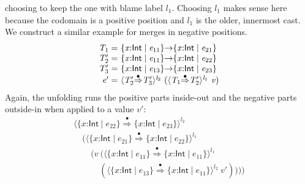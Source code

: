 \documentclass[9pt]{extarticle}
\newcommand{\ottnt}[1]{\mathit{#1}}
\begin{document}
choosing to keep the one with blame label $\ottnt{l_{{\mathrm{1}}}}$. Choosing $\ottnt{l_{{\mathrm{1}}}}$
makes sense here because the codomain is a positive position and
$\ottnt{l_{{\mathrm{1}}}}$ is the older, innermost cast.
We construct a similar example for merges in negative positions.
\[ \begin{array}{r@{~}l}
   \ottnt{T_{{\mathrm{1}}}} = &   \{ \mathit{x} \mathord{:}  \mathsf{Int}  \mathrel{\mid} \ottnt{e_{{\mathrm{11}}}} \}  \mathord{ \rightarrow }  \{ \mathit{x} \mathord{:}  \mathsf{Int}  \mathrel{\mid} \ottnt{e_{{\mathrm{21}}}} \}   \\
  \ottnt{T'_{{\mathrm{2}}}} = &   \{ \mathit{x} \mathord{:}  \mathsf{Int}  \mathrel{\mid} \ottnt{e_{{\mathrm{11}}}} \}  \mathord{ \rightarrow }  \{ \mathit{x} \mathord{:}  \mathsf{Int}  \mathrel{\mid} \ottnt{e_{{\mathrm{22}}}} \}   \\
  \ottnt{T'_{{\mathrm{3}}}} = &   \{ \mathit{x} \mathord{:}  \mathsf{Int}  \mathrel{\mid} \ottnt{e_{{\mathrm{13}}}} \}  \mathord{ \rightarrow }  \{ \mathit{x} \mathord{:}  \mathsf{Int}  \mathrel{\mid} \ottnt{e_{{\mathrm{23}}}} \}   \\
   \ottnt{e'} = &  \langle  \ottnt{T'_{{\mathrm{2}}}}  \mathord{ \overset{\bullet}{\Rightarrow} }  \ottnt{T'_{{\mathrm{3}}}}  \rangle^{ \ottnt{l_{{\mathrm{2}}}} } ~   (  \langle  \ottnt{T_{{\mathrm{1}}}}  \mathord{ \overset{\bullet}{\Rightarrow} }  \ottnt{T'_{{\mathrm{2}}}}  \rangle^{ \ottnt{l_{{\mathrm{1}}}} } ~  \mathit{v}  )   \\
\end{array} \]
Again, the unfolding runs the positive parts inside-out and the negative
parts outside-in when applied to a value $\mathit{v'}$:
\[ \begin{array}{l}
   \langle   \{ \mathit{x} \mathord{:}  \mathsf{Int}  \mathrel{\mid} \ottnt{e_{{\mathrm{22}}}} \}   \mathord{ \overset{\bullet}{\Rightarrow} }   \{ \mathit{x} \mathord{:}  \mathsf{Int}  \mathrel{\mid} \ottnt{e_{{\mathrm{23}}}} \}   \rangle^{ \ottnt{l_{{\mathrm{2}}}} } ~  {} \\  \quad   (  \langle   \{ \mathit{x} \mathord{:}  \mathsf{Int}  \mathrel{\mid} \ottnt{e_{{\mathrm{21}}}} \}   \mathord{ \overset{\bullet}{\Rightarrow} }   \{ \mathit{x} \mathord{:}  \mathsf{Int}  \mathrel{\mid} \ottnt{e_{{\mathrm{22}}}} \}   \rangle^{ \ottnt{l_{{\mathrm{1}}}} } ~  {} \\  \qquad   (  \mathit{v} ~  (  \langle   \{ \mathit{x} \mathord{:}  \mathsf{Int}  \mathrel{\mid} \ottnt{e_{{\mathrm{11}}}} \}   \mathord{ \overset{\bullet}{\Rightarrow} }   \{ \mathit{x} \mathord{:}  \mathsf{Int}  \mathrel{\mid} \ottnt{e_{{\mathrm{11}}}} \}   \rangle^{ \ottnt{l_{{\mathrm{1}}}} } ~  {} \\  \qquad  \quad   (  \langle   \{ \mathit{x} \mathord{:}  \mathsf{Int}  \mathrel{\mid} \ottnt{e_{{\mathrm{13}}}} \}   \mathord{ \overset{\bullet}{\Rightarrow} }   \{ \mathit{x} \mathord{:}  \mathsf{Int}  \mathrel{\mid} \ottnt{e_{{\mathrm{11}}}} \}   \rangle^{ \ottnt{l_{{\mathrm{2}}}} } ~  \mathit{v'}  )   )   )   )  
\end{array} \]
\end{document}
